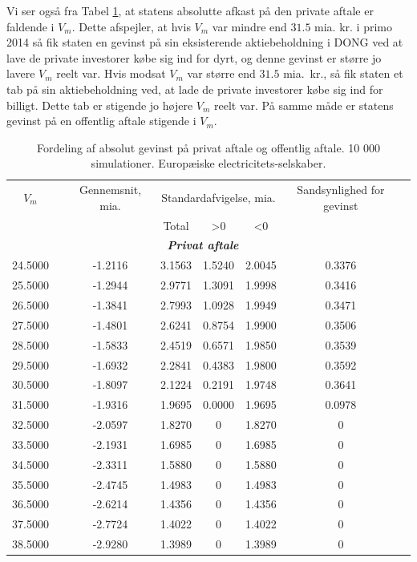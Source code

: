 \documentclass{article}
\begin{document}
Vi ser også fra Tabel \ref{tab:abs_fordeling}, at statens absolutte afkast på den private aftale er faldende i $V_m$. Dette afspejler, at hvis $V_m$ var mindre end $31.5$ mia. kr. i primo 2014 så fik staten en gevinst på sin eksisterende aktiebeholdning i DONG ved at lave de private investorer købe sig ind for dyrt, og denne gevinst er større jo lavere $V_m$ reelt var. Hvis modsat $V_m$ var større end $31.5$ mia.\ kr., så fik staten et tab på sin aktiebeholdning ved, at lade de private investorer købe sig ind for billigt. Dette tab er stigende jo højere $V_m$ reelt var. På samme måde er statens gevinst på en offentlig aftale stigende i $V_m$.

\begin{table}[h]
	\caption{Fordeling af absolut gevinst p\aa{} privat aftale og offentlig aftale. 10 000 simulationer. Europæiske electricitets-selskaber.}
	\label{tab:abs_fordeling}
	\begin{tabularx}{0.95\linewidth}{cXcccccr}
	\toprule[1pt] 
	$V_m$ && Gennemsnit, mia. & \multicolumn{3}{c}{Standardafvigelse, mia.}  & Sandsynlighed for gevinst\\
	& & &Total & >0 & <0 \\
	\hline 
	\multicolumn{7}{c}{\emph{\textbf{Privat aftale}}} \\
24.5000&&-1.2116& 3.1563& 1.5240& 2.0045& 0.3376\\
25.5000&&-1.2944& 2.9771& 1.3091& 1.9998& 0.3416\\
26.5000&&-1.3841& 2.7993& 1.0928& 1.9949& 0.3471\\
27.5000&&-1.4801& 2.6241& 0.8754& 1.9900& 0.3506\\
28.5000&&-1.5833& 2.4519& 0.6571& 1.9850& 0.3539\\
29.5000&&-1.6932& 2.2841& 0.4383& 1.9800& 0.3592\\
30.5000&&-1.8097& 2.1224& 0.2191& 1.9748& 0.3641\\
31.5000&&-1.9316& 1.9695& 0.0000& 1.9695& 0.0978\\
32.5000&&-2.0597& 1.8270&0& 1.8270&0\\
33.5000&&-2.1931& 1.6985&0& 1.6985&0\\
34.5000&&-2.3311& 1.5880&0& 1.5880&0\\
35.5000&&-2.4745& 1.4983&0& 1.4983&0\\
36.5000&&-2.6214& 1.4356&0& 1.4356&0\\
37.5000&&-2.7724& 1.4022&0& 1.4022&0\\
38.5000&&-2.9280& 1.3989&0& 1.3989&0\\

\end{tabularx}
\end{table}
\end{document}
